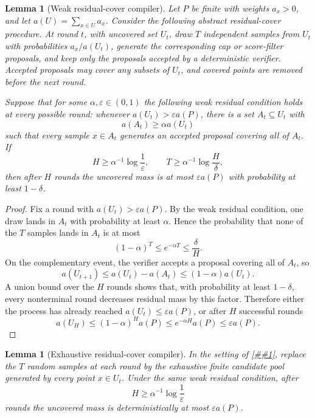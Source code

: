 \documentclass[10pt]{article}
\newcommand{\cref}[1]{\ref{##1}}
\newtheorem{lemma}[theorem]{Lemma}
\theoremstyle{definition}
\begin{document}
\begin{lemma}[Weak residual-cover compiler]\label{lem:weak-residual-cover}
   Let $P$ be finite with weights $a_x>0$, and let
   $a(U)=\sum_{x\in U}a_x$.  Consider the following abstract residual-cover
   procedure.  At round $t$, with uncovered set $U_t$, draw $T$ independent
   samples from $U_t$ with probabilities $a_x/a(U_t)$, generate the
   corresponding cap or score-filter proposals, and keep only the proposals
   accepted by a deterministic verifier.  Accepted proposals may cover any
   subsets of $U_t$, and covered points are removed before the next round.

   Suppose that for some $\alpha,\varepsilon\in(0,1)$ the following weak
   residual condition holds at every possible round: whenever
   $a(U_t)>\varepsilon a(P)$, there is a set $A_t\subseteq U_t$ with
   \[
      a(A_t)\ge\alpha a(U_t)
   \]
   such that every sample $x\in A_t$ generates an accepted proposal covering
   all of $A_t$.  If
   \[
      H\ge \alpha^{-1}\log\frac1\varepsilon,
      \qquad
      T\ge \alpha^{-1}\log\frac{H}{\delta},
   \]
   then after $H$ rounds the uncovered mass is at most
   $\varepsilon a(P)$ with probability at least $1-\delta$.
\end{lemma}

\begin{proof}
   Fix a round with $a(U_t)>\varepsilon a(P)$.  By the weak residual
   condition, one draw lands in $A_t$ with probability at least $\alpha$.
   Hence the probability that none of the $T$ samples lands in $A_t$ is at most
   \[
      (1-\alpha)^T\le e^{-\alpha T}\le\frac{\delta}{H}.
   \]
   On the complementary event, the verifier accepts a proposal covering all of
   $A_t$, so
   \[
      a(U_{t+1})\le a(U_t)-a(A_t)\le(1-\alpha)a(U_t).
   \]
   A union bound over the $H$ rounds shows that, with probability at least
   $1-\delta$, every nonterminal round decreases residual mass by this factor.
   Therefore either the process has already reached
   $a(U_t)\le\varepsilon a(P)$, or after $H$ successful rounds
   \[
      a(U_H)\le(1-\alpha)^H a(P)
      \le e^{-\alpha H}a(P)
      \le \varepsilon a(P).
   \]
\end{proof}

\begin{lemma}[Exhaustive residual-cover compiler]\label{lem:exhaustive-residual-cover}
   In the setting of \cref{lem:weak-residual-cover}, replace the $T$ random
   samples at each round by the exhaustive finite candidate pool generated by
   every point $x\in U_t$.  Under the same weak residual condition, after
   \[
      H\ge \alpha^{-1}\log\frac1\varepsilon
   \]
   rounds the uncovered mass is deterministically at most
   $\varepsilon a(P)$.
\end{lemma}
\end{document}
